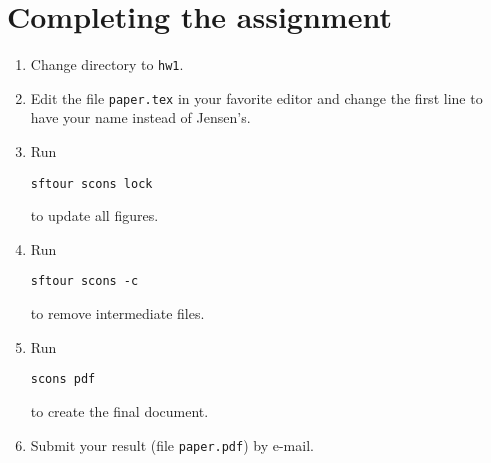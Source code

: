 \lstset{language=python,numbers=left,numberstyle=\tiny,showstringspaces=false}


\newpage

\section{Completing the assignment}

\begin{enumerate}
\item Change directory to \texttt{hw1}.
\item Edit the file \texttt{paper.tex} in your favorite editor and change the
first line to have your name instead of Jensen's.
\item Run
\begin{verbatim}
sftour scons lock
\end{verbatim}
to update all figures.
\item Run
\begin{verbatim}
sftour scons -c
\end{verbatim}
to remove intermediate files.
\item Run
\begin{verbatim}
scons pdf
\end{verbatim}
to create the final document.
\item Submit your result (file \texttt{paper.pdf}) by e-mail.
\end{enumerate}


